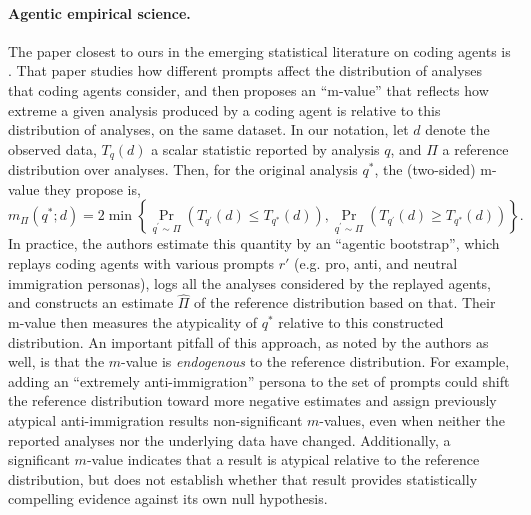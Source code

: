 \documentclass[10pt]{article}
\begin{document}
\paragraph{Agentic empirical science.} The paper closest to ours in the emerging statistical literature on coding agents is \citet{miao2026agentic}. That paper studies how different prompts affect the distribution of analyses that coding agents consider, and then proposes an ``m-value'' that reflects how extreme a given analysis produced by a coding agent is relative to this distribution of analyses, on the same dataset. In our notation, let $d$ denote the observed data, $T_q(d)$ a scalar statistic reported by analysis $q$, and $\Pi$ a reference distribution over analyses. Then, for the original analysis $q^*$, the (two-sided) m-value they propose is,
\[
m_{\Pi}\left(q^* ; d\right)=2 \min \left\{\operatorname{Pr}_{q^{\prime} \sim \Pi}\left(T_{q^{\prime}}(d) \leq T_{q^*}(d)\right), \operatorname{Pr}_{q^{\prime} \sim \Pi}\left(T_{q^{\prime}}(d) \geq T_{q^*}(d)\right)\right\}.
\]
In practice, the authors estimate this quantity by an ``agentic bootstrap'', which replays coding agents with various prompts $r'$ (e.g. pro, anti, and neutral immigration personas), logs all the analyses considered by the replayed agents, and constructs an estimate $\hat{\Pi}$ of the reference distribution based on that. Their m-value then measures the atypicality of $q^*$ relative to this constructed distribution. An important pitfall of this approach, as noted by the authors as well, is that the $m$-value is \textit{endogenous} to the reference distribution. For example, adding an ``extremely anti-immigration'' persona to the set of prompts could shift the reference distribution toward more negative estimates and assign previously atypical anti-immigration results non-significant $m$-values, even when neither the reported analyses nor the underlying data have changed. Additionally, a significant $m$-value indicates that a result is atypical relative to the reference distribution, but does not establish whether that result provides statistically compelling evidence against its own null hypothesis.
\end{document}
